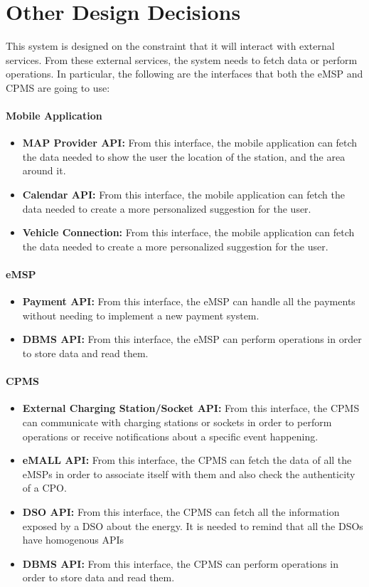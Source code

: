 \section{Other Design Decisions}
This system is designed on the constraint that it will interact with external services. From these external services, the system needs to fetch data or perform operations. In particular, the following are the interfaces that both the eMSP and CPMS are going to use:
\paragraph{Mobile Application}
\begin{itemize}
    \item \textbf{MAP Provider API: } From this interface, the mobile application can fetch the data needed to show the user the location of the station, and the area around it.
    \item \textbf{Calendar API: } From this interface, the mobile application can fetch the data needed to create a more personalized suggestion for the user.
    \item \textbf{Vehicle Connection: } From this interface, the mobile application can fetch the data needed to create a more personalized suggestion for the user.
\end{itemize}
\paragraph{eMSP}
\begin{itemize}
    \item \textbf{Payment API: } From this interface, the eMSP can handle all the payments without needing to implement a new payment system.
    \item \textbf{DBMS API: } From this interface, the eMSP can perform operations in order to store data and read them.
\end{itemize}
\paragraph{CPMS}
\begin{itemize}
    \item \textbf{External Charging Station/Socket API: } From this interface, the CPMS can communicate with charging stations or sockets in order to perform operations or receive notifications about a specific event happening.
    \item \textbf{eMALL API: } From this interface, the CPMS can fetch the data of all the eMSPs in order to associate itself with them and also check the authenticity of a CPO.
    \item \textbf{DSO API: } From this interface, the CPMS can fetch all the information exposed by a DSO about the energy. It is needed to remind that all the DSOs have homogenous APIs
    \item \textbf{DBMS API: } From this interface, the CPMS can perform operations in order to store data and read them.
\end{itemize}
\label{sec:otherDesign}
